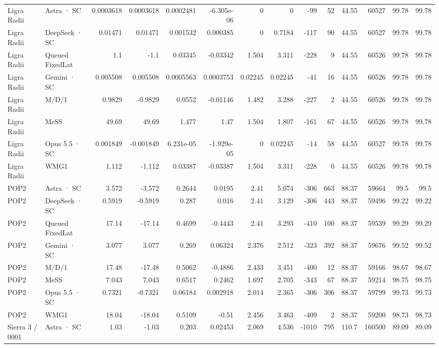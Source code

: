 \begin{tabular}{llrrrrrrrrrrrr}
Ligra Radii & Astra · SC & 0.0003618 & 0.0003618 & 0.0002481 & -6.305e-06 & 0 & 0 & -99 & 52 & 44.55 & 60527 & 99.78 & 99.78 \\
Ligra Radii & DeepSeek · SC & 0.01471 & 0.01471 & 0.001532 & 0.000385 & 0 & 0.7184 & -117 & 90 & 44.55 & 60527 & 99.78 & 99.78 \\
Ligra Radii & Queued FixedLat & 1.1 & -1.1 & 0.03345 & -0.03342 & 1.504 & 3.311 & -228 & 9 & 44.55 & 60526 & 99.78 & 99.78 \\
Ligra Radii & Gemini · SC & 0.005508 & 0.005508 & 0.0005563 & 0.0003753 & 0.02245 & 0.02245 & -41 & 16 & 44.55 & 60526 & 99.78 & 99.78 \\
Ligra Radii & M/D/1 & 0.9829 & -0.9829 & 0.0552 & -0.01146 & 1.482 & 3.288 & -227 & 2 & 44.55 & 60526 & 99.78 & 99.78 \\
Ligra Radii & MeSS & 49.69 & 49.69 & 1.477 & 1.47 & 1.504 & 1.807 & -161 & 67 & 44.55 & 60526 & 99.78 & 99.78 \\
Ligra Radii & Opus 5.5 · SC & 0.001849 & -0.001849 & 6.231e-05 & -1.929e-05 & 0 & 0.02245 & -14 & 58 & 44.55 & 60527 & 99.78 & 99.78 \\
Ligra Radii & WMG1 & 1.112 & -1.112 & 0.03387 & -0.03387 & 1.504 & 3.311 & -228 & 0 & 44.55 & 60526 & 99.78 & 99.78 \\
POP2 & Astra · SC & 3.572 & -3.572 & 0.2644 & 0.0195 & 2.41 & 5.074 & -306 & 663 & 88.37 & 59664 & 99.5 & 99.5 \\
POP2 & DeepSeek · SC & 0.5919 & -0.5919 & 0.287 & 0.016 & 2.41 & 3.129 & -306 & 443 & 88.37 & 59496 & 99.22 & 99.22 \\
POP2 & Queued FixedLat & 17.14 & -17.14 & 0.4699 & -0.4443 & 2.41 & 3.293 & -410 & 100 & 88.37 & 59539 & 99.29 & 99.29 \\
POP2 & Gemini · SC & 3.077 & 3.077 & 0.269 & 0.06324 & 2.376 & 2.512 & -323 & 392 & 88.37 & 59676 & 99.52 & 99.52 \\
POP2 & M/D/1 & 17.48 & -17.48 & 0.5062 & -0.4886 & 2.433 & 3.451 & -400 & 12 & 88.37 & 59166 & 98.67 & 98.67 \\
POP2 & MeSS & 7.043 & 7.043 & 0.6517 & 0.2462 & 1.697 & 2.705 & -343 & 67 & 88.37 & 59214 & 98.75 & 98.75 \\
POP2 & Opus 5.5 · SC & 0.7321 & -0.7321 & 0.06184 & 0.002918 & 2.014 & 2.365 & -306 & 306 & 88.37 & 59799 & 99.73 & 99.73 \\
POP2 & WMG1 & 18.04 & -18.04 & 0.5109 & -0.51 & 2.456 & 3.463 & -409 & 2 & 88.37 & 59200 & 98.73 & 98.73 \\
Sierra 3 / 0001 & Astra · SC & 1.03 & -1.03 & 0.203 & 0.02453 & 2.069 & 4.536 & -1010 & 795 & 110.7 & 160500 & 89.09 & 89.09 \\

\end{tabular}
